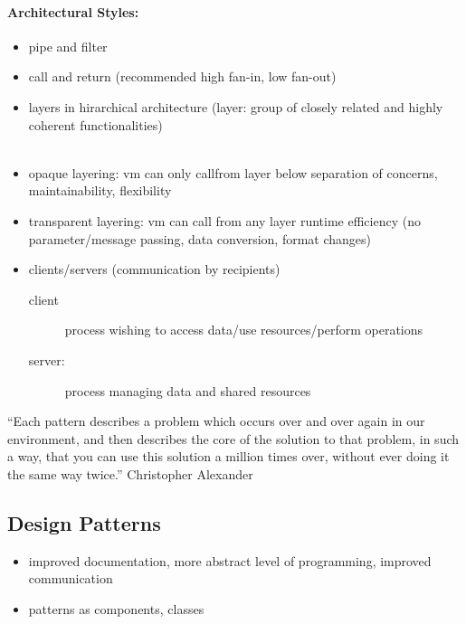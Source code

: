 \documentclass[a4paper, 10pt]{article}
\begin{document}
\paragraph{Architectural Styles:}
\begin{itemize}
	\item pipe and filter \\ 
	\item call and return (recommended high fan-in, low fan-out) \\ 
	\item layers in hirarchical architecture (layer: group of closely related and highly coherent functionalities) \\  \\ 
	\item opaque layering: vm can only callfrom layer below \follows separation of concerns, maintainability, flexibility
	\item transparent layering: vm can call from any layer \follows runtime efficiency (no parameter/message passing, data conversion, format changes)
	\item clients/servers (communication by recipients)
	\begin{description}
		\item[client] process wishing to access data/use resources/perform operations
		\item[server:] process managing data and shared resources
	\end{description}
\end{itemize}
\begin{shaded}
``Each pattern describes a problem which occurs over and over again in our environment, and then describes the core of the solution to that problem, in such a way, that you can use this solution a million times over, without ever doing it the same way twice.'' Christopher Alexander
\end{shaded}
\subsection{Design Patterns}
\begin{itemize}
	\item improved documentation, more abstract level of programming, improved communication
	\item patterns as components, classes
\end{itemize}
\end{document}
